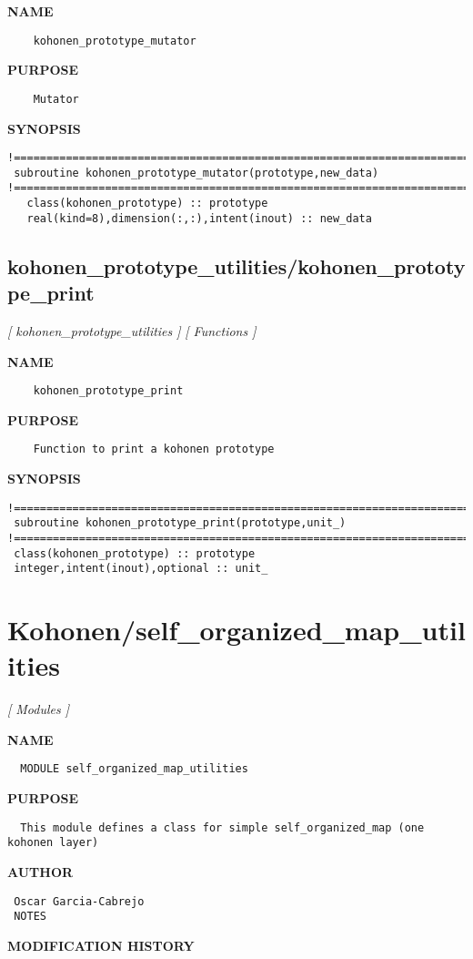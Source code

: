 \documentclass{article}
\begin{document}
\label{ch:robo33}
\label{ch:kohonen_prototype_utilities_kohonen_prototype_mutator}
\textbf{NAME}
\begin{verbatim}
    kohonen_prototype_mutator
\end{verbatim}
\textbf{PURPOSE}
\begin{verbatim}
    Mutator
\end{verbatim}
\textbf{SYNOPSIS}
\begin{verbatim}
!========================================================================================
 subroutine kohonen_prototype_mutator(prototype,new_data)
!========================================================================================
   class(kohonen_prototype) :: prototype
   real(kind=8),dimension(:,:),intent(inout) :: new_data
\end{verbatim}
\newpage
\subsection{kohonen\_prototype\_utilities/kohonen\_prototype\_print}
\textsl{[ kohonen\_prototype\_utilities ]}
\textsl{[ Functions ]}

\label{ch:robo34}
\label{ch:kohonen_prototype_utilities_kohonen_prototype_print}
\textbf{NAME}
\begin{verbatim}
    kohonen_prototype_print
\end{verbatim}
\textbf{PURPOSE}
\begin{verbatim}
    Function to print a kohonen prototype
\end{verbatim}
\textbf{SYNOPSIS}
\begin{verbatim}
!========================================================================================
 subroutine kohonen_prototype_print(prototype,unit_)
!========================================================================================
 class(kohonen_prototype) :: prototype
 integer,intent(inout),optional :: unit_
\end{verbatim}
\newpage
\section{Kohonen/self\_organized\_map\_utilities}
\textsl{[ Modules ]}

\label{ch:robo7}
\label{ch:Kohonen_self_organized_map_utilities}
\textbf{NAME}
\begin{verbatim}
  MODULE self_organized_map_utilities
\end{verbatim}
\textbf{PURPOSE}
\begin{verbatim}
  This module defines a class for simple self_organized_map (one kohonen layer) 
\end{verbatim}
\textbf{AUTHOR}
\begin{verbatim}
 Oscar Garcia-Cabrejo
 NOTES 
\end{verbatim}
\textbf{MODIFICATION HISTORY}
\newpage
\end{document}
